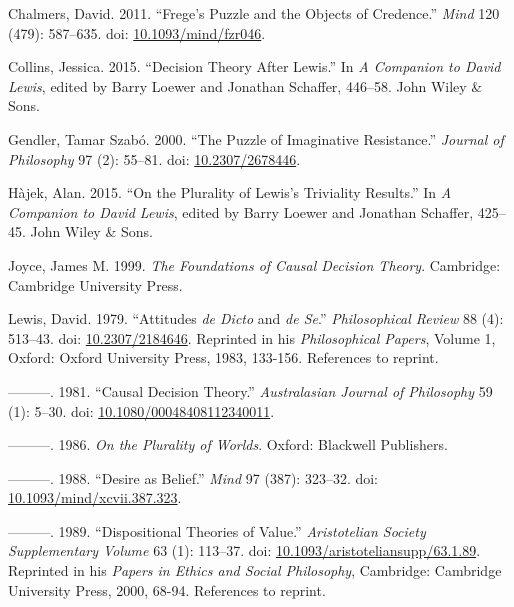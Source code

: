\documentclass[
  11pt,
  letterpaper,
  DIV=11,
  numbers=noendperiod,
  twoside]{scrartcl}
\newlength{\cslhangindent}
\newenvironment{CSLReferences}[2] %
 {\begin{list}{}{%
  \setlength{\itemindent}{0pt}
  \setlength{\leftmargin}{0pt}
  \setlength{\parsep}{0pt}
  \ifodd #1
   \setlength{\leftmargin}{\cslhangindent}
   \setlength{\itemindent}{-1\cslhangindent}
  \fi
  \setlength{\itemsep}{#2\baselineskip}}}
 {\end{list}}
\begin{document}
\protect{}\label{refs}
\begin{CSLReferences}{1}{0}
Chalmers, David. 2011. {``Frege's Puzzle and the Objects of Credence.''}
\emph{Mind} 120 (479): 587--635. doi:
\href{https://doi.org/10.1093/mind/fzr046}{10.1093/mind/fzr046}.

Collins, Jessica. 2015. {``Decision Theory After Lewis.''} In \emph{A
Companion to David Lewis}, edited by Barry Loewer and Jonathan Schaffer,
446--58. John Wiley \& Sons.

Gendler, Tamar Szabó. 2000. {``The Puzzle of Imaginative Resistance.''}
\emph{Journal of Philosophy} 97 (2): 55--81. doi:
\href{https://doi.org/10.2307/2678446}{10.2307/2678446}.

Hàjek, Alan. 2015. {``On the Plurality of Lewis's Triviality Results.''}
In \emph{A Companion to David Lewis}, edited by Barry Loewer and
Jonathan Schaffer, 425--45. John Wiley \& Sons.

Joyce, James M. 1999. \emph{The Foundations of Causal Decision Theory}.
Cambridge: Cambridge University Press.

Lewis, David. 1979. {``Attitudes \emph{de Dicto} and \emph{de Se}.''}
\emph{Philosophical Review} 88 (4): 513--43. doi:
\href{https://doi.org/10.2307/2184646}{10.2307/2184646}. Reprinted in
his \emph{Philosophical Papers}, Volume 1, Oxford: Oxford University
Press, 1983, 133-156. References to reprint.

---------. 1981. {``Causal Decision Theory.''} \emph{Australasian
Journal of Philosophy} 59 (1): 5--30. doi:
\href{https://doi.org/10.1080/00048408112340011}{10.1080/00048408112340011}.

---------. 1986. \emph{On the Plurality of Worlds}. Oxford: Blackwell
Publishers.

---------. 1988. {``Desire as Belief.''} \emph{Mind} 97 (387): 323--32.
doi:
\href{https://doi.org/10.1093/mind/xcvii.387.323}{10.1093/mind/xcvii.387.323}.

---------. 1989. {``Dispositional Theories of Value.''}
\emph{Aristotelian Society Supplementary Volume} 63 (1): 113--37. doi:
\href{https://doi.org/10.1093/aristoteliansupp/63.1.89}{10.1093/aristoteliansupp/63.1.89}.
Reprinted in his \emph{Papers in Ethics and Social Philosophy},
Cambridge: Cambridge University Press, 2000, 68-94. References to
reprint.


\end{CSLReferences}
\end{document}
